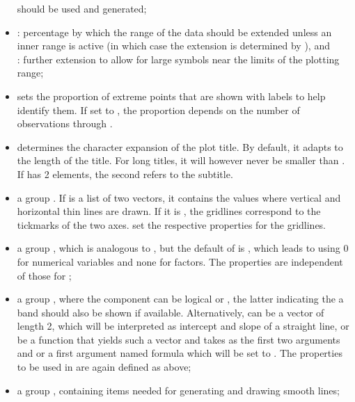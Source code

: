 \documentclass[11pt]{article}\usepackage[]{graphicx}\usepackage[]{color}
\begin{document}
\begin{itemize}
  should be used and generated;
\item
  : percentage by which the range of the data should be
  extended unless an inner range is active (in which case the extension 
  is determined by ), and\\
  : further extension to allow for large symbols near the 
  limits of the plotting range;
\item
   sets the proportion of extreme points that are shown 
  with labels to help identify them.
  If set to , the proportion depends on the number  of
  observations through .
\item
   determines the character expansion of the plot title.
  By default, it adapts to the length of the title.
  For long titles, it will however never be smaller than
  . 
  If  has 2 elements, the second refers to the subtitle.
\item
  a group . If  is a list of two vectors,
  it contains the values where vertical and horizontal thin lines are drawn.
  If it is , the gridlines correspond to the tickmarks of the
  two axes.
   set the respective
  properties for the gridlines.
\item
  a group , which is analogous to , but the
  default of  is , which leads to using 
  0 for numerical variables and none for factors. 
  The properties are independent of those for ;
\item
  a group , where the component  can be logical 
  or ,
  the latter indicating the a band should also be shown if available.
  Alternatively,  can be a vector of length 2, which will be
  interpreted as intercept and slope of a straight line, or be
  a function that yields such a vector and takes as the first two 
  arguments  and  or a first argument named formula which 
  will be set to .
  The properties  to be used in 
  are again defined as above;
\item
  a group , containing items needed for generating and drawing
  smooth lines;
  \label{options.smooth}

\end{itemize}
\end{document}
